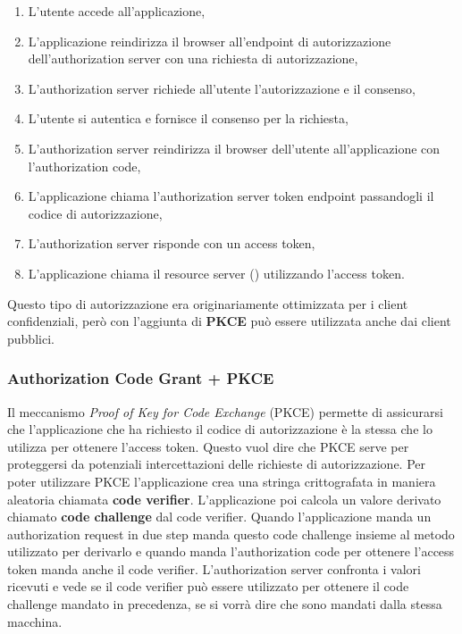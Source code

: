 \begin{enumerate}
      \item L'utente accede all'applicazione,
      \item L'applicazione reindirizza il browser all'endpoint di autorizzazione
            dell'authorization server con una richiesta di autorizzazione,
      \item L'authorization server richiede all'utente l'autorizzazione e il consenso,
      \item L'utente si autentica e fornisce il consenso per la richiesta,
      \item L'authorization server reindirizza il browser dell'utente all'applicazione
            con l'authorization code,
      \item L'applicazione chiama l'authorization server token endpoint passandogli
            il codice di autorizzazione,
      \item L'authorization server risponde con un access token,
      \item L'applicazione chiama il resource server (\api{}) utilizzando l'access token.
\end{enumerate}

Questo tipo di autorizzazione era originariamente ottimizzata per i
client confidenziali, però con l'aggiunta di \textbf{PKCE} può essere utilizzata anche dai
client pubblici.

\subsubsection{Authorization Code Grant + PKCE}

Il meccanismo \textit{Proof of Key for Code Exchange} (PKCE) permette di assicurarsi
che l'applicazione che ha richiesto il codice di autorizzazione è la stessa che lo
utilizza per ottenere l'access token. Questo vuol dire che PKCE serve per proteggersi
da potenziali intercettazioni delle richieste di autorizzazione.
Per poter utilizzare PKCE l'applicazione crea una stringa crittografata in maniera
aleatoria chiamata \textbf{code verifier}. L'applicazione poi calcola un valore derivato
chiamato \textbf{code challenge} dal code verifier. Quando l'applicazione manda un
authorization request in due step manda questo code challenge insieme al metodo utilizzato
per derivarlo e quando manda l'authorization code per ottenere l'access token manda anche
il code verifier. L'authorization server confronta i valori ricevuti e vede se
il code verifier può essere utilizzato per ottenere il code challenge mandato in precedenza,
se si vorrà dire che sono mandati dalla stessa macchina.\\

